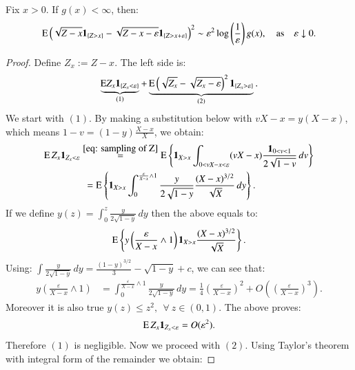 \begin{lemma}\label{lemma: variance without assum. g}
Fix $x >0$. If $g(x) < \infty$, then:
\begin{align*}
    \mathrm{E} \left(\sqrt{Z-x} \mathbf{1}_{\{Z>x\}}-\sqrt{Z-x-\varepsilon} \mathbf{1}_{\{Z>x+\varepsilon\}}\right)^2 \sim \varepsilon^2 \log \left( \frac{1}{\varepsilon} \right) g (x), \quad \text{as} \quad \varepsilon \downarrow 0.
\end{align*}
\end{lemma}
\begin{proof}
Define $Z_x := Z-x$. The left side is: 
\begin{align*}
\underbrace{\mathrm{E} Z_x \mathbf{1}_{\{ Z_x < \varepsilon \}}}_{(1)} + \underbrace{\mathrm{E} \left(\sqrt{Z_x} - \sqrt{Z_x - \varepsilon} \right)^2 \mathbf{1}_{\left\{ Z_x > \varepsilon \right\}}}_{(2)}. 
\end{align*}
We start with $(1)$. By making a substitution below with $vX - x = y(X-x)$, which means $1-v = (1-y)\frac{X-x}{X}$, we obtain:
\begin{align*}
   \mathrm{E}  \, Z_x \mathbf{1}_{Z_x < \varepsilon}  &\stackrel{\eqref{eq: sampling of Z}}{=} \mathrm{E}  \left\{ \mathbf{1}_{X > x} \int_{0 < vX - x < \varepsilon} (vX -x) \frac{\mathbf{1}_{0<v<1}}{2 \sqrt{1 - v}} \, dv \right\}  \\
    &\: \: = \mathrm{E}  \left\{ \mathbf{1}_{X> x} \int_{0}^{\frac{\varepsilon}{X - x} \wedge 1} \frac{y}{2 \sqrt{1-y}} \frac{(X-x)^{3/2}}{\sqrt{X}} \, dy\right\}.
\end{align*}
If we define $y(z) = \int_{0}^{z} \frac{y}{2 \sqrt{1-y}} \, dy$ then the above equals to:
\begin{align*}
    \mathrm{E}  \left\{  y\left(\frac{\varepsilon}{X - x} \wedge 1 \right) \mathbf{1}_{X> x} \frac{(X-x)^{3/2}}{\sqrt{X}} \right\}.
\end{align*}
Using: $\int \frac{y}{2 \sqrt{1-y}} \, dy = \frac{(1-y)^{3/2}}{3} - \sqrt{1-y} + c$, we can see that:
\begin{align*}
    y\left(\frac{\varepsilon}{X - x} \wedge 1\right) &= \int_{0}^{\frac{\varepsilon}{X - x} \wedge 1} \frac{y}{2 \sqrt{1-y}} \, dy =  \frac{1}{4} \left( \frac{\varepsilon}{X-x} \right)^2 + O\left( \left( \frac{\varepsilon}{X-x} \right)^3 \right).
\end{align*}
Moreover it is also true $y(z) \leq z^2, \: \: \forall \: z \in (0,1)$. The above proves:
\begin{align}\label{eq: EZa less equal}
\mathrm{E} \, Z_x \mathbf{1}_{Z_x < \varepsilon} = O(\varepsilon^2).     
\end{align}
Therefore $(1)$ is negligible. Now we proceed with $(2)$. Using Taylor's theorem with integral form of the remainder we obtain:

\end{proof}

